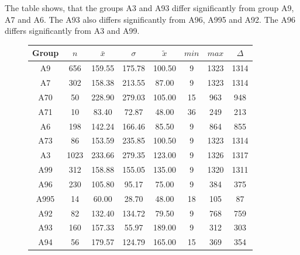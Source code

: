 The table shows, that the groups A3 and A93 differ significantly from group A9, A7 and A6. The A93 also differs significantly from A96, A995 and A92. The A96 differs significantly from A3 and A99.
\begin{figure}[ht!]
	\centering
	\begin{minipage}{0.5\textwidth}
		\tiny
		\setlength{\tabcolsep}{4pt}
		\centering
		\begin{tabular}{c|c|c|c|c|c|c|c}
			\toprule
			Group & $n$ & $\bar{x}$ & $\sigma$ & $\tilde{x}$ & $min$ & $max$ & $\Delta$ \\
			\midrule
			A9   & 656  & 159.55 & 175.78 & 100.50 & 9   & 1323 & 1314 \\ 
			A7   & 302  & 158.38 & 213.55 & 87.00  & 9   & 1323 & 1314 \\ 
			A70  & 50   & 228.90 & 279.03 & 105.00 & 15  & 963  & 948 \\ 
			A71  & 10   & 83.40  & 72.87  & 48.00  & 36  & 249  & 213 \\ 
			A6   & 198  & 142.24 & 166.46 & 85.50  & 9   & 864  & 855 \\ 
			A73  & 86   & 153.59 & 235.85 & 100.50 & 9   & 1323 & 1314 \\ 
			A3   & 1023 & 233.66 & 279.35 & 123.00 & 9   & 1326 & 1317 \\ 
			A99  & 312  & 158.88 & 155.05 & 135.00 & 9   & 1320 & 1311 \\ 
			A96  & 230  & 105.80 & 95.17  & 75.00  & 9   & 384  & 375 \\ 
			A995 & 14   & 60.00  & 28.70  & 48.00  & 18  & 105  & 87 \\ 
			A92  & 82   & 132.40 & 134.72 & 79.50  & 9   & 768  & 759 \\ 
			A93  & 160  & 157.33 & 55.97  & 189.00 & 9   & 312  & 303 \\  
			A94  & 56   & 179.57 & 124.79 & 165.00 & 15  & 369  & 354 \\ 
			\bottomrule
		\end{tabular}
		\label{tbl:descriptives_arbis_matched_Strasse_TMax}
	\end{minipage}%
	\begin{minipage}{0.55\textwidth}
\end{minipage}
\end{figure}
